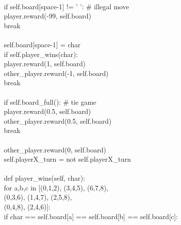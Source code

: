 \documentclass[a4paper, 12pt, notitlepage]{report}
\begin{document}
    \\
    \hspace*{12ex} if self.board[space-1] != ' ': \# illegal move \\
    \hspace*{16ex} 		player.reward(-99, self.board)\\ 
    \hspace*{16ex} break\\
    \\
    \hspace*{12ex} self.board[space-1] = char\\
    \hspace*{12ex} if self.player\_wins(char):\\
    \hspace*{16ex} 		player.reward(1, self.board)\\
    \hspace*{16ex} 		other\_player.reward(-1, self.board)\\
    \hspace*{16ex} 		break\\
    \\
    \hspace*{12ex} if self.board\_full(): \# tie game\\
    \hspace*{16ex} 		player.reward(0.5, self.board)\\
    \hspace*{16ex} 		other\_player.reward(0.5, self.board)\\
    \hspace*{16ex} 		break \\
    \\
    \hspace*{12ex} other\_player.reward(0, self.board)\\
    \hspace*{12ex} self.playerX\_turn = not self.playerX\_turn\\
    \\
    \hspace*{4ex} def player\_wins(self, char):\\
    \hspace*{8ex} for a,b,c in [(0,1,2), (3,4,5), (6,7,8),\\
    \hspace*{20ex}    (0,3,6), (1,4,7), (2,5,8),\\
    \hspace*{20ex}    (0,4,8), (2,4,6)]:\\
    \hspace*{12ex} if char == self.board[a] == self.board[b] == self.board[c]:\\
\end{document}
